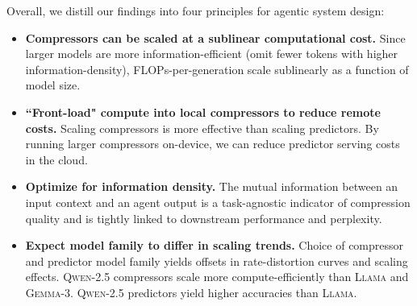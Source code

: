 \documentclass{article} %
\begin{document}
Overall, we distill our findings into four principles for agentic system design:

\begin{exampleboxprinciples}
\small
\begin{itemize}[leftmargin=*]
    \item \textbf{Compressors can be scaled at a sublinear computational cost.} Since larger models are more information-efficient (omit fewer tokens with higher information-density), FLOPs-per-generation scale sublinearly as a function of model size.
    \item \textbf{``Front-load" compute into local compressors to reduce remote costs.} Scaling compressors is more effective than scaling predictors. By running larger compressors on-device, we can reduce predictor serving costs in the cloud.
    \item \textbf{Optimize for information density.} The mutual information between an input context and an agent output is a task-agnostic indicator of compression quality and is tightly linked to downstream performance and perplexity. 
    \item \textbf{Expect model family to differ in scaling trends.} Choice of compressor and predictor model family yields offsets in rate-distortion curves and scaling effects. \textsc{Qwen-2.5} compressors scale more compute-efficiently than \textsc{Llama} and \textsc{Gemma-3}. \textsc{Qwen-2.5} predictors yield higher accuracies than \textsc{Llama}.
\end{itemize}
\end{exampleboxprinciples}



\end{document}
